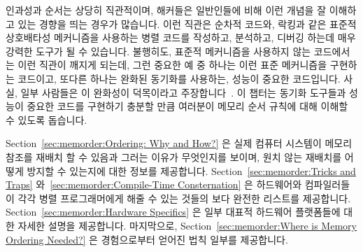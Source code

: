 
%

인과성과 순서는 상당히 직관적이며, 해커들은 일반인들에 비해 이런 개념을 잘
이해하고 있는 경향을 띄는 경우가 많습니다.
이런 직관은 순차적 코드와, 락킹과 같은 표준적 상호배타성 메커니즘을 사용하는
병렬 코드를 작성하고, 분석하고, 디버깅 하는데 매우 강력한 도구가 될 수
있습니다.
불행히도, 표준적 메커니즘을 사용하지 않는 코드에서는 이런 직관이 깨지게 되는데,
그런 중요한 예 중 하나는 이런 표준 메커니즘을 구현하는 코드이고, 또다른
하나는 완화된 동기화를 사용하는, 성능이 중요한 코드입니다.
사실, 일부 사람들은 이 완화성이 덕목이라고
주장합니다~\cite{JadeAlglave2013-WeaknessIsVirtue}.
이 챕터는 동기화 도구들과 성능이 중요한 코드를 구현하기 충분할 만큼 여러분이
메모리 순서 규칙에 대해 이해할 수 있도록 돕습니다.

Section~\ref{sec:memorder:Ordering: Why and How?}
은 실제 컴퓨터 시스템이 메모리 참조를 재배치 할 수 있음과 그러는 이유가
무엇인지를 보이며, 원치 않는 재배치를 어떻게 방지할 수 있는지에 대한 정보를
제공합니다.
Section~\ref{sec:memorder:Tricks and Traps}
와~\ref{sec:memorder:Compile-Time Consternation}
은 하드웨어와 컴파일러들이 각각 병렬 프로그래머에게 해줄 수 있는 것들의 보다
완전한 리스트를 제공합니다.
Section~\ref{sec:memorder:Hardware Specifics}
은 일부 대표적 하드웨어 플랫폼들에 대한 자세한 설명을 제공합니다.
마지막으로, Section~\ref{sec:memorder:Where is Memory Ordering Needed?}
은 경험으로부터 얻어진 법칙 일부를 제공합니다.
\iffalse

